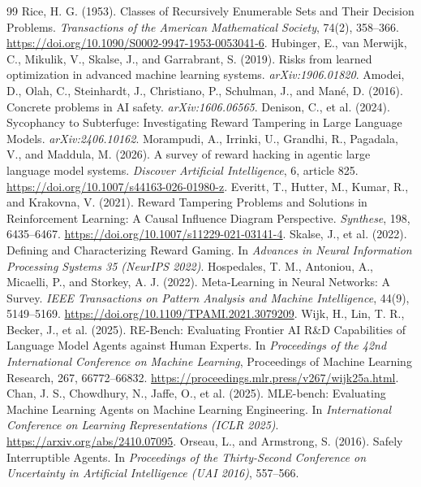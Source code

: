 \documentclass[11pt,a4paper]{article}
\begin{document}
\begin{thebibliography}{99}
 Rice, H. G. (1953).
Classes of Recursively Enumerable Sets and Their
Decision Problems.
\emph{Transactions of the American Mathematical Society},
74(2), 358--366.
\url{https://doi.org/10.1090/S0002-9947-1953-0053041-6}.
 Hubinger, E., van Merwijk, C., Mikulik, V., Skalse, J., and Garrabrant, S. (2019). Risks from learned optimization in advanced machine learning systems. \emph{arXiv:1906.01820}.
 Amodei, D., Olah, C., Steinhardt, J., Christiano, P., Schulman, J., and Man\'e, D. (2016). Concrete problems in AI safety. \emph{arXiv:1606.06565}.
 Denison, C., et al. (2024). Sycophancy to Subterfuge: Investigating Reward Tampering in Large Language Models. \emph{arXiv:2406.10162}.
 Morampudi, A., Irrinki, U., Grandhi, R., Pagadala, V., and Maddula, M. (2026). A survey of reward hacking in agentic large language model systems. \emph{Discover Artificial Intelligence}, 6, article 825. \url{https://doi.org/10.1007/s44163-026-01980-z}.
 Everitt, T., Hutter, M.,
Kumar, R., and Krakovna, V. (2021).
Reward Tampering Problems and Solutions in Reinforcement Learning:
A Causal Influence Diagram Perspective.
\emph{Synthese}, 198, 6435--6467.
\url{https://doi.org/10.1007/s11229-021-03141-4}.
 Skalse, J., et al. (2022).
Defining and Characterizing Reward Gaming.
In \emph{Advances in Neural Information Processing Systems 35 (NeurIPS 2022)}.
 Hospedales, T. M., Antoniou, A.,
Micaelli, P., and Storkey, A. J. (2022).
Meta-Learning in Neural Networks: A Survey.
\emph{IEEE Transactions on Pattern Analysis and Machine Intelligence},
44(9), 5149--5169.
\url{https://doi.org/10.1109/TPAMI.2021.3079209}.
Wijk, H., Lin, T. R., Becker, J., et al. (2025).
RE-Bench: Evaluating Frontier AI R\&D Capabilities
of Language Model Agents against Human Experts.
In \emph{Proceedings of the 42nd International
Conference on Machine Learning},
Proceedings of Machine Learning Research,
267, 66772--66832.
\url{https://proceedings.mlr.press/v267/wijk25a.html}.
Chan, J. S., Chowdhury, N., Jaffe, O., et al. (2025).
MLE-bench: Evaluating Machine Learning Agents
on Machine Learning Engineering.
In \emph{International Conference on
Learning Representations (ICLR 2025)}.
\url{https://arxiv.org/abs/2410.07095}.
 Orseau, L., and Armstrong, S. (2016).
Safely Interruptible Agents.
In \emph{Proceedings of the Thirty-Second Conference on
Uncertainty in Artificial Intelligence (UAI 2016)}, 557--566.

\end{thebibliography}
\end{document}
